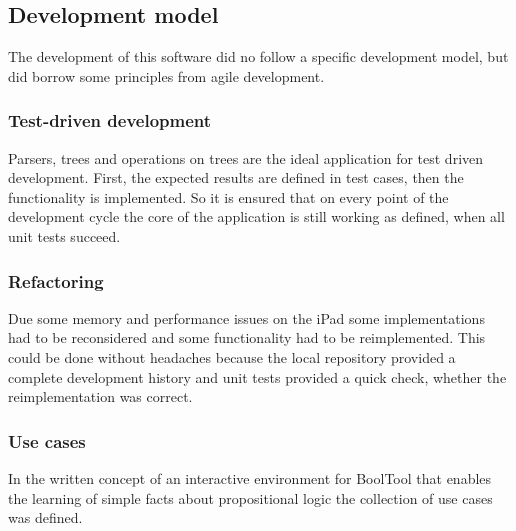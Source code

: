 \subsection{Development model}

The development of this software did no follow a specific development model, 
but did borrow some principles from agile development.

\subsubsection{Test-driven development}

Parsers, trees and operations on trees are the ideal application for test driven development.
First, the expected results are defined in test cases, then the functionality is implemented.
So it is ensured that on every point of the development cycle 
the core of the application is still working as defined,
when all unit tests succeed.


\subsubsection{Refactoring}

Due some memory and performance issues on the iPad 
some implementations had to be reconsidered 
and some functionality had to be reimplemented.
This could be done without headaches because 
the local repository provided a complete development history 
and unit tests provided a quick check, whether the reimplementation was correct.


\subsubsection{Use cases}

In the written concept of an interactive environment for BoolTool that enables the learning  of simple facts about propositional logic the collection of use cases was defined.


